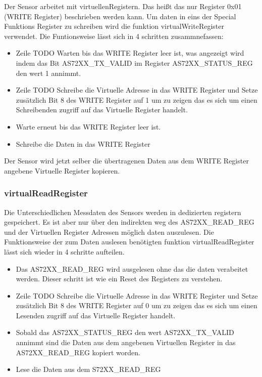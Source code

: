Der Sensor arbeitet mit virtuellenRegistern.
Das heißt das nur Register 0x01 (WRITE Register) beschrieben werden kann.
Um daten in eins der Special Funktions Register zu schreiben wird die funktion virtualWriteRegister verwendet.
Die Funtionsweise lässt sich in 4 schritten zusammnefassen:
\begin{itemize}
	\item Zeile TODO Warten bis das WRITE Register leer ist, was angezeigt wird indem  das Bit AS72XX\_TX\_VALID im  Register AS72XX\_STATUS\_REG den wert 1 annimmt.
	\item Zeile TODO Schreibe die Virtuelle Adresse in das WRITE Register und Setze zusätzlich Bit 8 des WRITE Register auf 1 um zu zeigen das es sich um einen Schreibenden zugriff auf das Virtuelle Register handelt.
	\item Warte erneut bis das WRITE Register leer ist.
	\item Schreibe die Daten in das WRITE Register
\end{itemize}
Der Sensor wird jetzt selber die übertragenen Daten aus dem WRITE Register angebene Virtuelle Register kopieren.

\subsubsection{virtualReadRegister}
Die Unterschiedlichen Messdaten des Sensors werden in dedizierten registern gespeichert.
 Es ist aber nur über den indirekten weg des AS72XX\_READ\_REG und der Virtuellen Register Adressen möglich daten auszulesen.
Die Funktionsweise der zum Daten auslesen benötigten funktion virtualReadRegister lässt sich wieder in 4 schritte aufteilen.
\begin{itemize}
	\item Das AS72XX\_READ\_REG wird ausgelesen ohne das die daten verabeitet werden. Dieser schritt ist wie ein Reset des Registers zu verstehen.
	\item Zeile TODO Schreibe die Virtuelle Adresse in das WRITE Register und Setze zusätzlich Bit 8 des WRITE Register auf 0 um zu zeigen das es sich um einen Lesenden zugriff auf das Virtuelle Register handelt.
	\item Sobald das AS72XX\_STATUS\_REG den wert AS72XX\_TX\_VALID annimmt sind die Daten aus dem angebenen Virtuellen Register in das AS72XX\_READ\_REG kopiert worden.
	\item Lese die Daten aus dem S72XX\_READ\_REG
\end{itemize}



